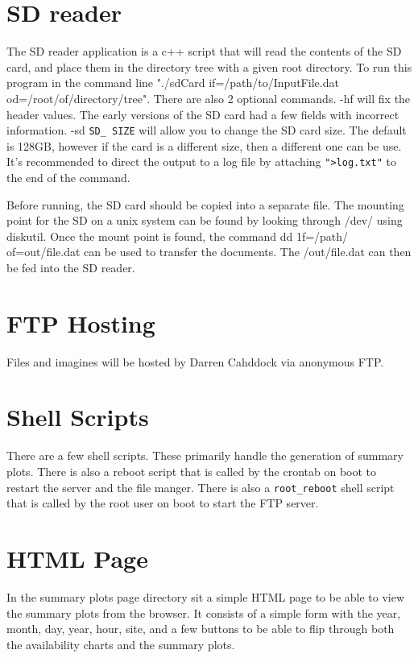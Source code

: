 \documentclass{article}
\begin{document}
\section{SD reader}

The SD reader application is a c++ script that will read the contents of the SD card, and place them in the directory tree with a given root directory. To run this program in the command line "./sdCard if=/path/to/InputFile.dat od=/root/of/directory/tree". There are also 2 optional commands. -hf will fix the header values. The early versions of the SD card had a few fields with incorrect information. -sd \texttt{SD\_ SIZE} will allow you to change the SD card size. The default is 128GB, however if the card is a different size, then a different one can be use. It's recommended to direct the output to a log file by attaching \texttt{">log.txt"} to the end of the command. 

Before running, the SD card should be copied into a separate file. The mounting point for the SD on a unix system can be found by looking through /dev/ using diskutil. Once the mount point is found, the command dd 1f=/path/ of=out/file.dat can be used to transfer the documents. The /out/file.dat can then be fed into the SD reader. 

\section{FTP Hosting}
Files and imagines will be hosted by Darren Cahddock via anonymous FTP.

\section{Shell Scripts}

There are a few shell scripts. These primarily handle the generation of summary plots. There is also a reboot script that is called by the crontab on boot to restart the server and the file manger. There is also a \texttt{root\_reboot} shell script that is called by the root user on boot to start the FTP server. 



\section{HTML Page}
In the summary plots page directory sit a simple HTML page to be able to view the summary plots from the browser. It consists of a simple form with the year, month, day, year, hour, site, and a few buttons to be able to flip through both the availability charts and the summary plots.
\end{document}
